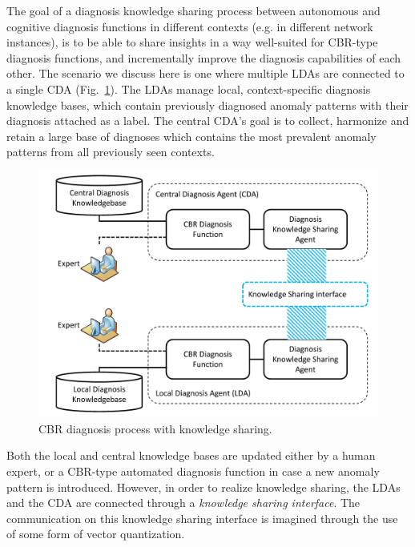 			The goal of a diagnosis knowledge sharing process between autonomous and cognitive diagnosis functions in different contexts (e.g. in different network instances), is to be able to share insights in a way well-suited for \ac{CBR}-type diagnosis functions, and incrementally improve the diagnosis capabilities of each other.
			The scenario we discuss here is one where multiple \acp{LDA} are connected to a single \ac{CDA} (Fig.~\ref{fig:diag_lda_cda}).
			The \acp{LDA} manage local, context-specific diagnosis knowledge bases, which contain previously diagnosed anomaly patterns with their diagnosis attached as a label.
			The central \ac{CDA}'s goal is to collect, harmonize and retain a large base of diagnoses which contains the most prevalent anomaly patterns from all previously seen contexts.
			
			\begin{figure}[ht]
				\centering
				\includegraphics[width=0.8\linewidth]{figures/03_quantization/diag_lda_cda/diag_lda_cda.pdf}
				\caption[CBR diagnosis with knowledge sharing]{CBR diagnosis process with knowledge sharing.}
				\label{fig:diag_lda_cda}
			\end{figure}
			
			Both the local and central knowledge bases are updated either by a human expert, or a \ac{CBR}-type automated diagnosis function in case a new anomaly pattern is introduced.
			However, in order to realize knowledge sharing, the \acp{LDA} and the \ac{CDA} are connected through a \textit{knowledge sharing interface}.
			The communication on this knowledge sharing interface is imagined through the use of some form of vector quantization.
			
